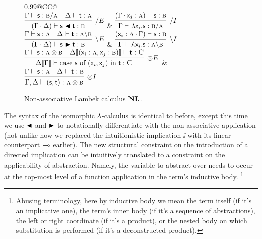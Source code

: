 \begin{figure}
	\centering
	\begin{tabularx}{0.99\textwidth}{@{}CC@{}}
		\\[2em]
		$\infer[\divright E]{(\Gamma \sbind \Delta) \vdash \term{s}\nappright\term{t}: \prop{b}}{\Gamma \vdash \term{s}: \prop{b} \divright \prop{a} & \Delta \vdash \term{t}: \prop{a}}$
		& 
		$\infer[\divright I]{\Gamma \vdash \term{\lam \vari .s}: \prop{b} \divright \prop{a}}{(\Gamma \sbind \term{\vari }: \prop{a}) \vdash \term{s}:\prop{b}}$\\[2em]
		$\infer[\divleft E]{(\Gamma \sbind \Delta) \vdash \term{s}\nappleft\term{t}:\prop{b}}{\Gamma \vdash \term{s}: \prop{a} & \Delta \vdash \term{t}: \prop{a}\divleft\prop{b}}$
		& 
		$\infer[\divleft I]{\Gamma \vdash \term{\adbmal \vari .s}: \prop{a} \divleft \prop{b}}{(\term{\vari }: \prop{a} \sbind \Gamma) \vdash  \term{s}:\prop{b}}$\\[2em]
		$\infer[\otimes E]{\Delta\ctx{\Gamma} \vdash \cterm{case \term{s} of \term{(\vari , \varj)} in \term{t}}: \prop C}{
			\Gamma \vdash \term{s}: \prop{a}\otimes\prop{b}
			&
			\Delta\ctx{(\term{\vari }: \prop{a}, \term{\varj}: \prop{b})}  \vdash \term{t}: \prop C}$
		&
		$\infer[\otimes I]{\Gamma,\Delta \vdash \term{(s,t)}: \prop{a} \otimes \prop{b}}{\Gamma \vdash \term{s}: \prop{a} & \Delta \vdash \term{t}: \prop{b}}$
	\end{tabularx}
	\caption{Non-associative Lambek calculus $\textbf{NL}$.}
	\label{figure:non_assoc_lambek_rules}
\end{figure}

The syntax of the isomorphic $\mathnormal{\lambda}$-calculus is identical to before, except this time we use $\blacktriangleleft$ and $\blacktriangleright$ to notationally differentiate with the non-associative application (not unlike how we replaced the intuitionistic implication $\ii$ with its linear counterpart $\li$ earlier).
The new structural constraint on the introduction of a directed implication can be intuitively translated to a constraint on the applicability of abstraction.
Namely, the variable to abstract over needs to occur at the top-most level of a function application in the term's inductive body.%
\footnote{Abusing terminology, here by inductive body we mean the term itself (if it's an implicative one), the term's inner body (if it's a sequence of abstractions), the left or right coordinate (if it's a product), or the nested body on which substitution is performed (if it's a deconstructed product).}

